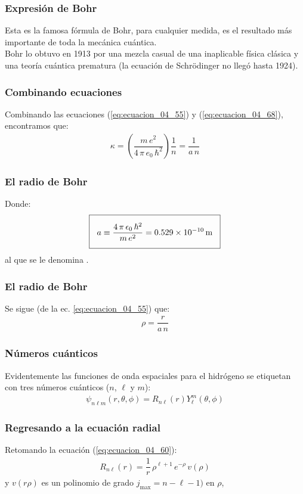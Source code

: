 \documentclass[12pt]{beamer}
\begin{document}
\begin{frame}
\frametitle{Expresión de Bohr}
Esta es la famosa fórmula de Bohr, para cualquier medida, es el resultado más importante de toda la mecánica cuántica.
\\
\bigskip
\pause
Bohr lo obtuvo en 1913 por una mezcla casual de una inaplicable física clásica y una teoría cuántica prematura (la ecuación de Schrödinger no llegó hasta 1924).
\end{frame}
\begin{frame}
\frametitle{Combinando ecuaciones}
Combinando las ecuaciones (\ref{eq:ecuacion_04_55}) y (\ref{eq:ecuacion_04_68}), encontramos que:
\pause
\begin{align}
\kappa = \left( \dfrac{m \, e^{2}}{4 \, \pi \, e_{0} \, \hbar^{2}} \right) \dfrac{1}{n} = \dfrac{1}{a \, n}
\label{eq:ecuacion_04_71}
\end{align}
\end{frame}
\begin{frame}
\frametitle{El radio de Bohr}
Donde:
\pause
\begin{align}
\setlength{\fboxsep}{3\fboxsep}\boxed{a \equiv \dfrac{4 \, \pi \, \epsilon_{0} \, \hbar^{2}}{m \, e^{2}} = \SI{0.529e-10}{\metre}}
\label{eq:ecuacion_04_72}
\end{align}
al que se le denomina .
\end{frame}
\begin{frame}
\frametitle{El radio de Bohr}
Se sigue (de la ec. \ref{eq:ecuacion_04_55}) que:
\pause
\begin{align}
\rho = \dfrac{r}{a \, n}
\label{eq:ecuacion_04_73}
\end{align}
\end{frame}
\begin{frame}
\frametitle{Números cuánticos}
Evidentemente las funciones de onda espaciales para el hidrógeno se etiquetan con tres números cuánticos ($n$, $\ell$ y $m$):
\pause
\begin{align}
\psi_{n \ell m} (r, \theta, \phi) =  R_{n \ell} (r) Y_{\ell}^{m} (\theta, \phi)
\label{eq:ecuacion_04_74}
\end{align}
\end{frame}
\begin{frame}
\frametitle{Regresando a la ecuación radial}
Retomando la ecuación (\ref{eq:ecuacion_04_60}):
\pause
\begin{align}
R_{n \ell}(r) = \dfrac{1}{r} \, \rho^{\ell + 1} \, e^{-\rho} \, v (\rho)
\label{eq:ecuacion_04_75}
\end{align}
y $v(r\rho)$ es un polinomio de grado $j_{\text{max}} = n - \ell - 1)$ en $\rho$,
\end{frame}
\end{document}
